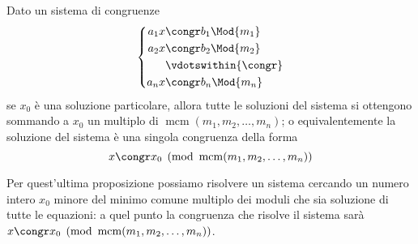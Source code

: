 \begin{proposition}
    Dato un sistema di congruenze 
    \begin{equation*}
        \left\{
        \begin{alignedat}{1}
            a_1x &\congr b_1 \Mod{m_1}\\
            a_2x &\congr b_2 \Mod{m_2}\\
            &\vdotswithin{\congr} \\
            a_nx &\congr b_n \Mod{m_n}
        \end{alignedat}      
        \right . 
    \end{equation*}
    se $x_0$ è una soluzione particolare, allora tutte le soluzioni del sistema si ottengono sommando a $x_0$ un multiplo di $\operatorname{mcm}(m_1, m_2, \dots, m_n)$; o equivalentemente la soluzione del sistema è una singola congruenza della forma
    \begin{equation}
        x \congr x_0 \pmod{\operatorname{mcm}(m_1, m_2, \dots, m_n)}
    \end{equation}
\end{proposition}

Per quest'ultima proposizione possiamo risolvere un sistema cercando un numero intero $x_0$ minore del minimo comune multiplo dei moduli che sia soluzione di tutte le equazioni: a quel punto la congruenza che risolve il sistema sarà $x \congr x_0 \pmod{\operatorname{mcm}(m_1, m_2, \dots, m_n)}$.
